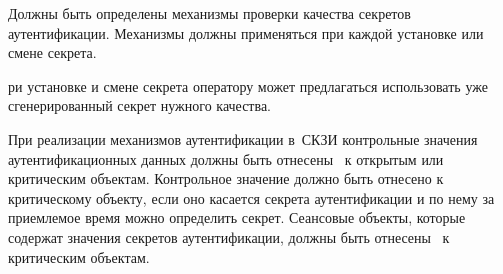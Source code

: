 \label{R.IA.PwdSet} %
Должны быть определены механизмы проверки качества 
секретов аутентификации. Механизмы должны применяться при каждой 
установке или смене секрета.

\begin{note*}
ри установке и смене секрета оператору может предлагаться 
использовать уже сгенерированный секрет нужного качества.
\end{note*}

\label{R.IA.AuthProtect} %
При реализации механизмов аутентификации в~СКЗИ контрольные значения
аутентификационных данных должны быть отнесены~ к открытым
или критическим объектам.
%
Контрольное значение должно быть отнесено к критическому объекту, 
если оно касается секрета аутентификации и по нему за приемлемое
время можно определить секрет.
%
Сеансовые объекты, которые содержат значения секретов аутентификации,
должны быть отнесены~ к критическим объектам.

